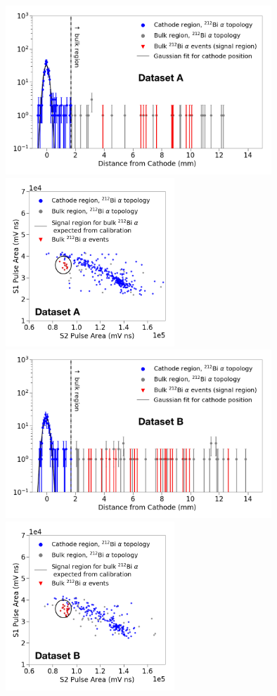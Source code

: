 \begin{figure}
\centering
\includegraphics[height=2.5in]{figures/radon/hist_a.png} \includegraphics[height=2.5in]{figures/radon/signalregion_a.png}\\
\includegraphics[height=2.5in]{figures/radon/hist_b.png} \includegraphics[height=2.5in]{figures/radon/signalregion_b.png}

\end{figure}
